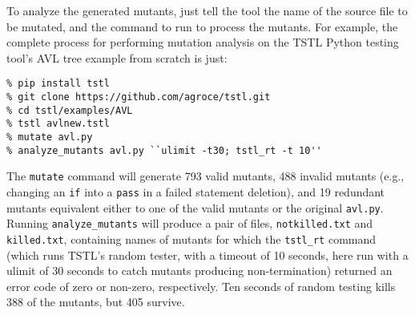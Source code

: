 To analyze the generated mutants, just tell the tool the name of the
source file to be mutated, and the command to run to process the
mutants.  For example, the complete process for performing mutation
analysis on the TSTL \cite{tstlsttt,nfm15} Python testing tool's AVL tree example from scratch is just:


\begin{verbatim}
% pip install tstl
% git clone https://github.com/agroce/tstl.git
% cd tstl/examples/AVL
% tstl avlnew.tstl
% mutate avl.py
% analyze_mutants avl.py ``ulimit -t30; tstl_rt -t 10''
\end{verbatim}

The {\tt mutate} command will generate 793 valid mutants, 488 invalid
mutants (e.g., changing an {\tt if} into a {\tt pass} in a failed
statement deletion), and 19 redundant mutants equivalent either to one
of the valid mutants or the original {\tt avl.py}.
Running {\tt analyze\_mutants} will produce a pair of files, {\tt notkilled.txt} and {\tt
  killed.txt}, containing names of mutants for which the {\tt tstl\_rt}
command (which runs TSTL's random tester, with a timeout of 10
seconds, here run with a ulimit of 30 seconds to catch mutants
producing non-termination)
returned an error code of zero or non-zero, respectively.  Ten seconds
of random testing kills 388 of the mutants, but 405 survive.